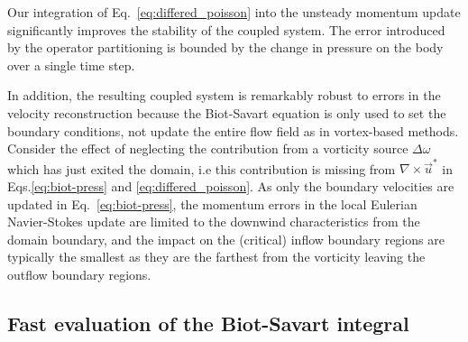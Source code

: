 \documentclass[final,1p,times]{elsarticle}
\begin{document}
Our integration of Eq.~\ref{eq:differed_poisson} into the unsteady momentum update significantly improves the stability of the coupled system. The error introduced by the operator partitioning is bounded by the change in pressure on the body over a single time step. %

In addition, the resulting coupled system is remarkably robust to errors in the velocity reconstruction because the Biot-Savart equation is only used to set the boundary conditions, not update the entire flow field as in vortex-based methods. Consider the effect of neglecting the contribution from a vorticity source $\Delta\omega$ which has just exited the domain, i.e this contribution is missing from $\nabla\times\vec u^*$ in Eqs.\ref{eq:biot-press} and \ref{eq:differed_poisson}. As only the boundary velocities are updated in Eq.~\ref{eq:biot-press}, the momentum errors in the local Eulerian Navier-Stokes update are limited to the downwind characteristics from the domain boundary, and the impact on the (critical) inflow boundary regions are typically the smallest as they are the farthest from the vorticity leaving the outflow boundary regions. 


\subsection{Fast evaluation of the Biot-Savart integral}
\end{document}
